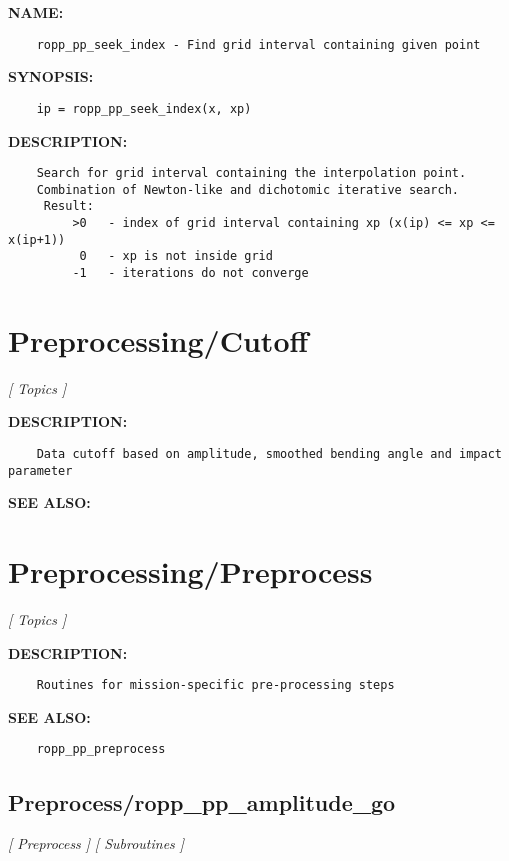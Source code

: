 \label{ch:robo66}
\label{ch:PPUtils_ropp_pp_seek_index}
\textbf{NAME:}\hspace{0.08in}\begin{Verbatim}
    ropp_pp_seek_index - Find grid interval containing given point
\end{Verbatim}
\textbf{SYNOPSIS:}\hspace{0.08in}\begin{Verbatim}
    ip = ropp_pp_seek_index(x, xp)
\end{Verbatim}
\textbf{DESCRIPTION:}\hspace{0.08in}\begin{Verbatim}
    Search for grid interval containing the interpolation point.
    Combination of Newton-like and dichotomic iterative search.
     Result:
         >0   - index of grid interval containing xp (x(ip) <= xp <= x(ip+1))
          0   - xp is not inside grid
         -1   - iterations do not converge
\end{Verbatim}
\section{Preprocessing/Cutoff}
\textsl{[ Topics ]}

\label{ch:robo69}
\label{ch:Preprocessing_Cutoff}
\textbf{DESCRIPTION:}\hspace{0.08in}\begin{Verbatim}
    Data cutoff based on amplitude, smoothed bending angle and impact parameter
\end{Verbatim}
\textbf{SEE ALSO:}\hspace{0.08in}\section{Preprocessing/Preprocess}
\textsl{[ Topics ]}

\label{ch:robo70}
\label{ch:Preprocessing_Preprocess}
\textbf{DESCRIPTION:}\hspace{0.08in}\begin{Verbatim}
    Routines for mission-specific pre-processing steps
\end{Verbatim}
\textbf{SEE ALSO:}\hspace{0.08in}\begin{Verbatim}
    ropp_pp_preprocess
\end{Verbatim}
\subsection{Preprocess/ropp\_pp\_amplitude\_go}
\textsl{[ Preprocess ]}
\textsl{[ Subroutines ]}

